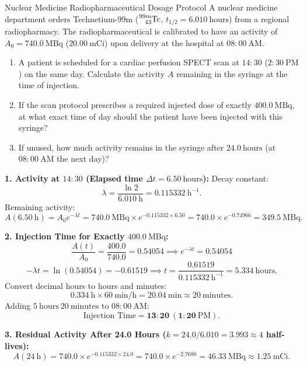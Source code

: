 \begin{exercise}{Nuclear Medicine Radiopharmaceutical Dosage Protocol}
A nuclear medicine department orders Technetium-99m ($\ce{^{99m}_{43}Tc}$, $t_{1/2} = 6.010\ \mathrm{hours}$) from a regional radiopharmacy. The radiopharmaceutical is calibrated to have an activity of $A_0 = 740.0\ \mathrm{MBq}$ ($20.00\ \mathrm{mCi}$) upon delivery at the hospital at $08:00\ \mathrm{AM}$.
\begin{enumerate}[leftmargin=1.5em,itemsep=2pt]
  \item A patient is scheduled for a cardiac perfusion SPECT scan at $14:30$ ($2:30\ \mathrm{PM}$) on the same day. Calculate the activity $A$ remaining in the syringe at the time of injection.
  \item If the scan protocol prescribes a required injected dose of exactly $400.0\ \mathrm{MBq}$, at what exact time of day should the patient have been injected with this syringe?
  \item If unused, how much activity remains in the syringe after $24.0\ \mathrm{hours}$ (at $08:00\ \mathrm{AM}$ the next day)?
\end{enumerate}
\end{exercise}

\begin{tabletworkspace}[5.0cm]
\end{tabletworkspace}

\begin{solution}
\textbf{1. Activity at $14:30$ (Elapsed time $\Delta t = 6.50\ \mathrm{hours}$):}
Decay constant:
\[
\lambda = \frac{\ln 2}{6.010\ \mathrm{h}} = 0.115332\ \mathrm{h^{-1}}.
\]
Remaining activity:
\[
A(6.50\ \mathrm{h}) = A_0 e^{-\lambda t} = 740.0\ \mathrm{MBq} \times e^{-0.115332 \times 6.50} = 740.0 \times e^{-0.74966} = \mathbf{349.5\ \mathrm{MBq}}.
\]

\textbf{2. Injection Time for Exactly $400.0\ \mathrm{MBq}$:}
\[
\frac{A(t)}{A_0} = \frac{400.0}{740.0} = 0.54054 \implies e^{-\lambda t} = 0.54054
\]
\[
-\lambda t = \ln(0.54054) = -0.61519 \implies t = \frac{0.61519}{0.115332\ \mathrm{h^{-1}}} = 5.334\ \mathrm{hours}.
\]
Convert decimal hours to hours and minutes:
\[
0.334\ \mathrm{h} \times 60\ \mathrm{min/h} = 20.04\ \mathrm{min} \approx 20\ \mathrm{minutes}.
\]
Adding $5\ \mathrm{hours}\ 20\ \mathrm{minutes}$ to $08:00\ \mathrm{AM}$:
\[
\text{Injection Time} = \mathbf{13:20\ (1:20\ \mathrm{PM})}.
\]

\textbf{3. Residual Activity After 24.0 Hours ($k = 24.0 / 6.010 = 3.993 \approx 4$ half-lives):}
\[
A(24\ \mathrm{h}) = 740.0 \times e^{-0.115332 \times 24.0} = 740.0 \times e^{-2.7680} = \mathbf{46.33\ \mathrm{MBq}} \approx \mathbf{1.25\ \mathrm{mCi}}.
\]
\end{solution}

